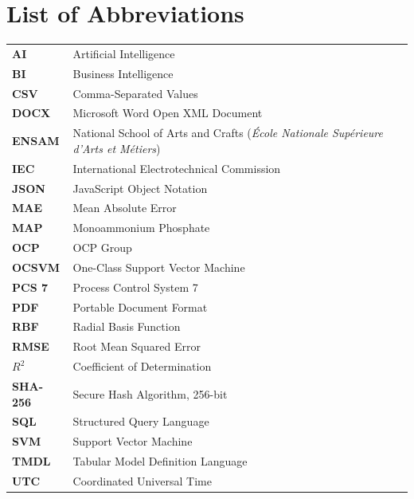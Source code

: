\chapter*{List of Abbreviations}

\begingroup
\renewcommand{\arraystretch}{1.16}
\begin{tabularx}{\textwidth}{@{}>{\bfseries\color{DeepBlue}}l@{\hspace{10mm}}Y@{}}
AI & Artificial Intelligence \tabularnewline
BI & Business Intelligence \tabularnewline
CSV & Comma-Separated Values \tabularnewline
DOCX & Microsoft Word Open XML Document \tabularnewline
ENSAM & National School of Arts and Crafts (\emph{\'Ecole Nationale Sup\'erieure d'Arts et M\'etiers}) \tabularnewline
IEC & International Electrotechnical Commission \tabularnewline
JSON & JavaScript Object Notation \tabularnewline
MAE & Mean Absolute Error \tabularnewline
MAP & Monoammonium Phosphate \tabularnewline
OCP & OCP Group \tabularnewline
OCSVM & One-Class Support Vector Machine \tabularnewline
PCS 7 & Process Control System 7 \tabularnewline
PDF & Portable Document Format \tabularnewline
RBF & Radial Basis Function \tabularnewline
RMSE & Root Mean Squared Error \tabularnewline
$R^2$ & Coefficient of Determination \tabularnewline
SHA-256 & Secure Hash Algorithm, 256-bit \tabularnewline
SQL & Structured Query Language \tabularnewline
SVM & Support Vector Machine \tabularnewline
TMDL & Tabular Model Definition Language \tabularnewline
UTC & Coordinated Universal Time \tabularnewline
\end{tabularx}
\endgroup
